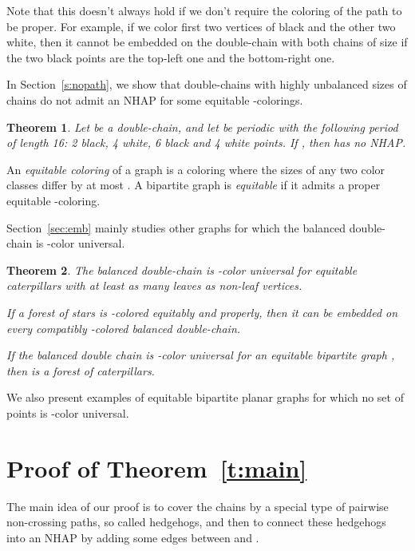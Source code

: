 \documentclass[12pt]{article}
\newtheorem{theorem}{Theorem}[section]
\begin{document}
Note that this doesn't always hold if we don't require the coloring of the path to be proper. For example, 
if we color first two vertices of  black and the other two white, then it cannot be embedded on the 
double-chain with both chains of size  if the two black points are the top-left one and the bottom-right one.

In Section~\ref{s:nopath}, we show that double-chains with highly unbalanced sizes of chains
do not admit an NHAP for some equitable -colorings.

\begin{theorem} \label{t:nopath}
Let  be a double-chain, and let  be periodic with the following period of length 16:
2 black, 4 white, 6 black and 4 white points.
If , then  has no NHAP.
\end{theorem}

An \emph{equitable coloring} of a graph is a coloring where the sizes of any two color classes differ by at most .
A bipartite graph is \emph{equitable} if it admits a proper equitable -coloring.

Section~\ref{sec:emb} mainly studies other graphs for which the balanced double-chain is -color universal.

\begin{theorem}
\label{thm:eqonbal}
The balanced double-chain is -color universal for equitable caterpillars with at least as many leaves 
as non-leaf vertices. 
\par If a forest of stars is -colored equitably and properly, then it can be embedded on every 
compatibly -colored balanced double-chain.
\par If the balanced double chain is -color universal for an equitable bipartite graph , then
 is a forest of caterpillars.
\end{theorem}

We also present examples of equitable bipartite planar graphs for which no set of points is -color universal.






\section{Proof of Theorem~\ref{t:main}}\label{s:mainthm}

The main idea of our proof is to cover the chains  by a special type of
pairwise non-crossing paths, so called
hedgehogs, and then to connect these hedgehogs into an NHAP by adding some
edges between  and .
\end{document}
